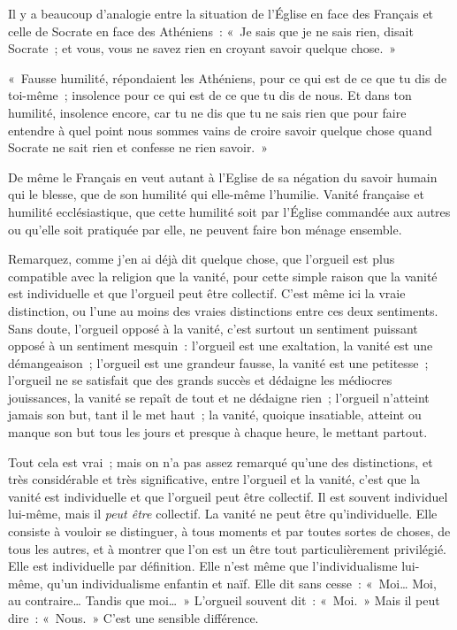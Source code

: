 \documentclass[french,twoside]{book} %
\begin{document}
Il y a beaucoup d’analogie entre la situation de l’Église en face des Français et celle de Socrate en face des Athéniens : « Je sais que je ne sais rien, disait Socrate ; et vous, vous ne savez rien en croyant savoir quelque chose. »\par
« Fausse humilité, répondaient les Athéniens, pour ce qui est de ce que tu dis de toi-même ; insolence pour ce qui est de ce que tu dis de nous. Et dans ton humilité, insolence encore, car tu ne dis que tu ne sais rien que pour faire entendre à quel point nous sommes vains de croire savoir quelque chose quand Socrate ne sait rien et confesse ne rien savoir. »\par
De même le Français en veut autant à l’Eglise de sa négation du savoir humain qui le blesse, que de son humilité qui elle-même l’humilie. Vanité française et humilité ecclésiastique, que cette humilité  soit par l’Église commandée aux autres ou qu’elle soit pratiquée par elle, ne peuvent faire bon ménage ensemble.\par
Remarquez, comme j’en ai déjà dit quelque chose, que l’orgueil est plus compatible avec la religion que la vanité, pour cette simple raison que la vanité est individuelle et que l’orgueil peut être collectif. C’est même ici la vraie distinction, ou l’une au moins des vraies distinctions entre ces deux sentiments. Sans doute, l’orgueil opposé à la vanité, c’est surtout un sentiment puissant opposé à un sentiment mesquin : l’orgueil est une exaltation, la vanité est une démangeaison ; l’orgueil est une grandeur fausse, la vanité est une petitesse ; l’orgueil ne se satisfait que des grands succès et dédaigne les médiocres jouissances, la vanité se repaît de tout et ne dédaigne rien ; l’orgueil n’atteint jamais son but, tant il le met haut ; la vanité, quoique insatiable, atteint ou manque son but tous les jours et presque à chaque heure, le mettant partout.\par
Tout cela est vrai ; mais on n’a pas assez remarqué qu’une des distinctions, et très considérable et très significative, entre l’orgueil et la vanité, c’est que la vanité est individuelle et que l’orgueil peut être collectif. Il est souvent individuel lui-même, mais il {\itshape peut être} collectif. La vanité ne peut  être qu’individuelle. Elle consiste à vouloir se distinguer, à tous moments et par toutes sortes de choses, de tous les autres, et à montrer que l’on est un être tout particulièrement privilégié. Elle est individuelle par définition. Elle n’est même que l’individualisme lui-même, qu’un individualisme enfantin et naïf. Elle dit sans cesse : « Moi… Moi, au contraire… Tandis que moi… » L’orgueil souvent dit : « Moi. » Mais il peut dire : « Nous. » C’est une sensible différence.\par
\end{document}

